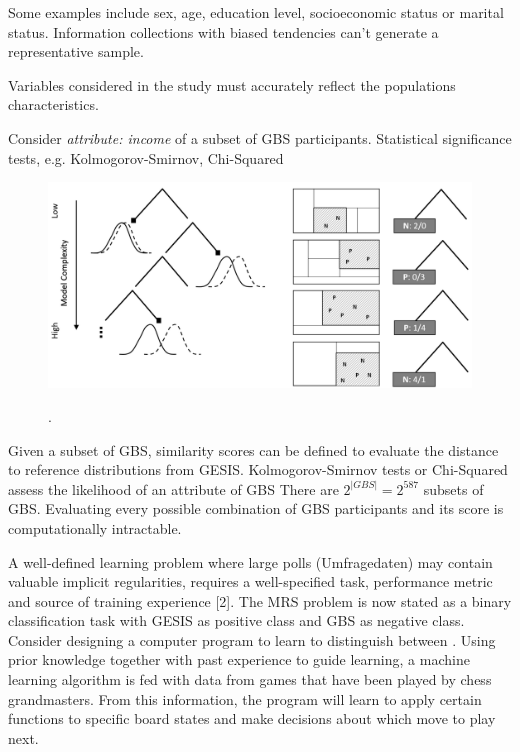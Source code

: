 
Some examples include sex, age, education level, socioeconomic status or marital status. Information collections with biased tendencies can't generate a representative sample.

Variables considered in the study must accurately reflect the populations characteristics. 

Consider \textit{attribute: income} of a subset of GBS participants. Statistical significance tests, e.g. Kolmogorov-Smirnov, Chi-Squared

\begin{figure}[ht]
	\begin{center}
		\includegraphics[scale=0.40,angle=0]{fig/tree3}
		\label{project}
		\caption{.}
	\end{center}
\end{figure}

Given a subset of GBS, similarity scores can be defined to evaluate the distance to reference distributions from GESIS. Kolmogorov-Smirnov tests or Chi-Squared assess the likelihood of an attribute of GBS  There are \(2^{|GBS|} = 2^{587}\) subsets of GBS. Evaluating every possible combination of GBS participants and its score is computationally intractable.

A well-deﬁned learning problem where large polls (Umfragedaten) may contain valuable implicit regularities, requires a well-speciﬁed task, performance metric and source of training experience [2]. The MRS problem is now stated as a binary classification task with GESIS as positive class and GBS as negative class. Consider designing a computer program to learn to distinguish between . Using prior knowledge together with past experience to guide learning, a machine learning algorithm
is fed with data from games that have been played by chess grandmasters. From this information, the program will learn to apply certain functions to speciﬁc board states and make decisions about which move to play next.

